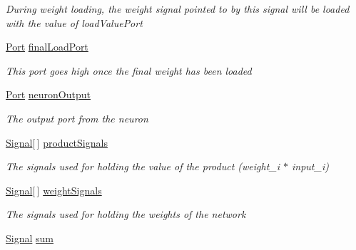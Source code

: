 \begin{DoxyCompactItemize}
\begin{DoxyCompactList}\small\item\em During weight loading, the weight signal pointed to by this signal will be loaded with the value of load\+Value\+Port \end{DoxyCompactList}\item 
\hyperlink{class_n_n_gen_1_1_port}{Port} \hyperlink{class_n_n_gen_1_1_async_neuron_a06f594e2b75be48f0444010a2204d7b2}{final\+Load\+Port}
\begin{DoxyCompactList}\small\item\em This port goes high once the final weight has been loaded \end{DoxyCompactList}\item 
\hyperlink{class_n_n_gen_1_1_port}{Port} \hyperlink{class_n_n_gen_1_1_async_neuron_a5b2ce64b48dcdfeddd29ea02a933f119}{neuron\+Output}
\begin{DoxyCompactList}\small\item\em The output port from the neuron \end{DoxyCompactList}\item 
\hyperlink{class_n_n_gen_1_1_signal}{Signal}\mbox{[}$\,$\mbox{]} \hyperlink{class_n_n_gen_1_1_async_neuron_a73d47ce9be628ff13a518e071f695096}{product\+Signals}
\begin{DoxyCompactList}\small\item\em The signals used for holding the value of the product (weight\+\_\+i $\ast$ input\+\_\+i) \end{DoxyCompactList}\item 
\hyperlink{class_n_n_gen_1_1_signal}{Signal}\mbox{[}$\,$\mbox{]} \hyperlink{class_n_n_gen_1_1_async_neuron_aeeb431fe55c9cda6e2889691c27c344c}{weight\+Signals}
\begin{DoxyCompactList}\small\item\em The signals used for holding the weights of the network \end{DoxyCompactList}\item 
\hyperlink{class_n_n_gen_1_1_signal}{Signal} \hyperlink{class_n_n_gen_1_1_async_neuron_abcb9157df57ac1f3751b2e730703bd58}{sum}

\end{DoxyCompactItemize}

